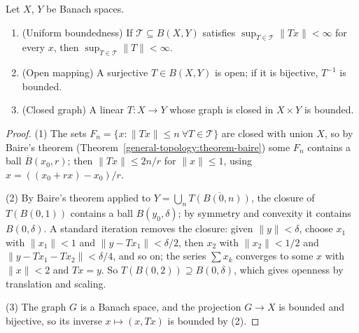\begin{theorem}\label{functional-analysis:theorem-baire-consequences}
Let $X$, $Y$ be Banach spaces.
\begin{enumerate}
\item (Uniform boundedness) If $\mathcal{T} \subseteq B(X, Y)$ satisfies $\sup_{T \in \mathcal{T}}\|Tx\| < \infty$ for every $x$, then $\sup_{T \in \mathcal{T}}\|T\| < \infty$.
\item (Open mapping) A surjective $T \in B(X, Y)$ is open; if it is bijective, $T^{-1}$ is bounded.
\item (Closed graph) A linear $T \colon X \to Y$ whose graph is closed in $X \times Y$ is bounded.
\end{enumerate}
\end{theorem}

\begin{proof}
(1) The sets $F_n = \{x : \|Tx\| \leq n \ \forall T \in \mathcal{T}\}$ are closed with union $X$, so by Baire's theorem (Theorem~\ref{general-topology:theorem-baire}) some $F_n$ contains a ball
$\overline{B}(x_0, r)$; then $\|Tx\| \leq 2n/r$ for $\|x\| \leq 1$, using $x = ((x_0 + rx) - x_0)/r$.

(2) By Baire's theorem applied to $Y = \bigcup_n\overline{T(B(0, n))}$, the closure of $T(B(0, 1))$ contains a ball $B(y_0, \delta)$; by symmetry and convexity it contains $B(0, \delta)$. A standard iteration
removes the closure: given $\|y\| < \delta$, choose $x_1$ with $\|x_1\| < 1$ and $\|y - Tx_1\| < \delta/2$, then $x_2$ with $\|x_2\| < 1/2$ and $\|y - Tx_1 - Tx_2\| < \delta/4$, and so on; the series
$\sum x_k$ converges to some $x$ with $\|x\| < 2$ and $Tx = y$. So $T(B(0, 2)) \supseteq B(0, \delta)$, which gives openness by translation and scaling.

(3) The graph $G$ is a Banach space, and the projection $G \to X$ is bounded and bijective, so its inverse $x \mapsto (x, Tx)$ is bounded by (2).
\end{proof}

